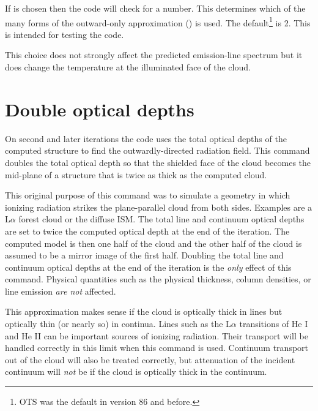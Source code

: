 If  is chosen then the code will check for a number.
This determines which of the many forms of the outward-only
approximation (\citealp{Tarter1967}) is used.
The default\footnote{OTS was the default in version 86 and before.} is 2.  This is intended for testing the code.

This choice does not strongly affect the predicted emission-line spectrum
but it does change the temperature at the illuminated face of the cloud.

\section{Double optical depths}

On second and later iterations the code uses the total optical depths
of the computed structure to find the outwardly-directed radiation field.
This command doubles the total optical depth so that the shielded face of
the cloud becomes the mid-plane of a structure that is twice as thick as
the computed cloud.

This original purpose of this command was to simulate a geometry in which
ionizing radiation strikes the plane-parallel cloud from both sides.
Examples are a L$\alpha$ forest cloud or the diffuse ISM.
The total line and
continuum optical depths are set to twice the computed optical depth at
the end of the iteration.
The computed model is then one half of the cloud
and the other half of the cloud is assumed to be a mirror image
of the first half.
Doubling the total line and continuum optical depths at the end of
the iteration is the \emph{only} effect of this command.
Physical quantities such
as the physical thickness, column densities, or line emission
\emph{are not} affected.

This approximation makes sense if the cloud is optically thick in lines
but optically thin (or nearly so) in continua.
Lines such as the L$\alpha $
transitions of He I and He II can be important sources
of ionizing radiation.
Their transport will be handled correctly in this limit when this command
is used.
Continuum transport out of the cloud will also be treated
correctly, but attenuation of the incident continuum will
\emph{not} be if the
cloud is optically thick in the continuum.

